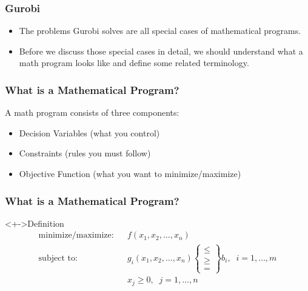\documentclass[12pt,handout]{beamer}
\begin{document}
\begin{frame}
\frametitle{Gurobi}
\begin{itemize}
\item The problems Gurobi solves are all special cases of mathematical programs. 
\item Before we discuss those special cases in detail, we should understand what a math program looks like and define some related terminology.
\end{itemize}
\end{frame}

\begin{frame}
\frametitle{What is a Mathematical Program?}
A math program consists of three components:
\begin{itemize}
\item Decision Variables (what you control)
\item Constraints (rules you must follow)
\item Objective Function (what you want to minimize/maximize)
\end{itemize}
\end{frame}

\begin{frame}
\frametitle{What is a Mathematical Program?}
\begin{block}<+->{Definition}
\begin{eqnarray}
\mbox{minimize/maximize:} && f(x_1, x_2, \ldots, x_n) \nonumber \\
\mbox{subject to:} && g_i(x_1, x_2, \ldots, x_n)
\begin{Bmatrix}   \le \\
                   \ge \\
                   =
\end{Bmatrix}
b_i, \;\; i = 1, \ldots, m \nonumber \\
&& x_j \ge 0,\;\;j = 1, \ldots, n \nonumber
\end{eqnarray}
\end{block}
\end{frame}
\end{document}
